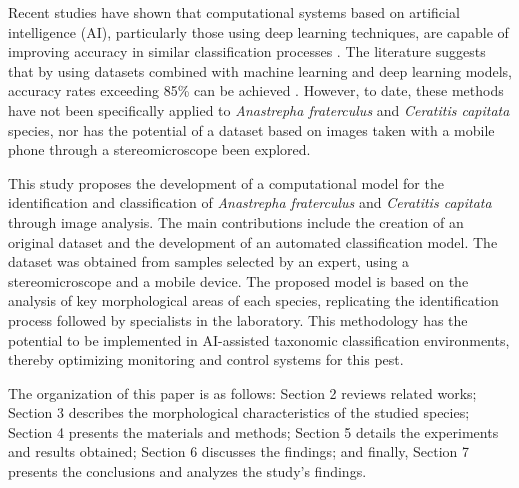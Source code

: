 Recent studies have shown that computational systems based on artificial intelligence (AI), particularly those using deep learning techniques, are capable of improving accuracy in similar classification processes \cite{4Das2018, 22Toke2020}. The literature suggests that by using datasets combined with machine learning and deep learning models, accuracy rates exceeding 85\% can be achieved \cite{7Faria2014, 9Martins2019, 13Leonardo2017}. However, to date, these methods have not been specifically applied to \textit{Anastrepha fraterculus} and \textit{Ceratitis capitata} species, nor has the potential of a dataset based on images taken with a mobile phone through a stereomicroscope been explored.

This study proposes the development of a computational model for the identification and classification of \textit{Anastrepha fraterculus} and \textit{Ceratitis capitata} through image analysis. The main contributions include the creation of an original dataset and the development of an automated classification model. The dataset was obtained from samples selected by an expert, using a stereomicroscope and a mobile device. The proposed model is based on the analysis of key morphological areas of each species, replicating the identification process followed by specialists in the laboratory. This methodology has the potential to be implemented in AI-assisted taxonomic classification environments, thereby optimizing monitoring and control systems for this pest.

The organization of this paper is as follows: Section 2 reviews related works; Section 3 describes the morphological characteristics of the studied species; Section 4 presents the materials and methods; Section 5 details the experiments and results obtained; Section 6 discusses the findings; and finally, Section 7 presents the conclusions and analyzes the study's findings.